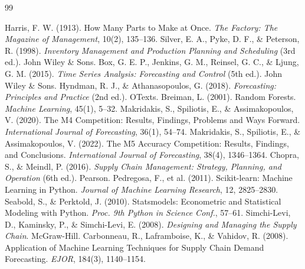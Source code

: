 \documentclass[12pt,a4paper]{report}
\begin{document}
\newpage
\begin{thebibliography}{99}
 Harris, F. W. (1913). How Many Parts to Make at Once. \textit{The Factory: The Magazine of Management}, 10(2), 135--136.
 Silver, E. A., Pyke, D. F., \& Peterson, R. (1998). \textit{Inventory Management and Production Planning and Scheduling} (3rd ed.). John Wiley \& Sons.
 Box, G. E. P., Jenkins, G. M., Reinsel, G. C., \& Ljung, G. M. (2015). \textit{Time Series Analysis: Forecasting and Control} (5th ed.). John Wiley \& Sons.
 Hyndman, R. J., \& Athanasopoulos, G. (2018). \textit{Forecasting: Principles and Practice} (2nd ed.). OTexts.
 Breiman, L. (2001). Random Forests. \textit{Machine Learning}, 45(1), 5--32.
 Makridakis, S., Spiliotis, E., \& Assimakopoulos, V. (2020). The M4 Competition: Results, Findings, Problems and Ways Forward. \textit{International Journal of Forecasting}, 36(1), 54--74.
 Makridakis, S., Spiliotis, E., \& Assimakopoulos, V. (2022). The M5 Accuracy Competition: Results, Findings, and Conclusions. \textit{International Journal of Forecasting}, 38(4), 1346--1364.
 Chopra, S., \& Meindl, P. (2016). \textit{Supply Chain Management: Strategy, Planning, and Operation} (6th ed.). Pearson.
 Pedregosa, F., et al. (2011). Scikit-learn: Machine Learning in Python. \textit{Journal of Machine Learning Research}, 12, 2825--2830.
 Seabold, S., \& Perktold, J. (2010). Statsmodels: Econometric and Statistical Modeling with Python. \textit{Proc. 9th Python in Science Conf.}, 57--61.
 Simchi-Levi, D., Kaminsky, P., \& Simchi-Levi, E. (2008). \textit{Designing and Managing the Supply Chain}. McGraw-Hill.
 Carbonneau, R., Laframboise, K., \& Vahidov, R. (2008). Application of Machine Learning Techniques for Supply Chain Demand Forecasting. \textit{EJOR}, 184(3), 1140--1154.
\end{thebibliography}
\end{document}
